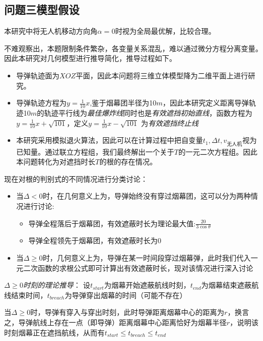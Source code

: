 \documentclass{article}
\begin{document}
\subsection{问题三模型假设}
本研究中将$无人机移动方向角\alpha = 0$时视为全局最优解，比较合理。

不难观察出，本题限制条件繁杂，各变量关系混乱，难以通过微分方程分离变量。因此本研究对几何模型进行推导简化，推导过程如下。

\begin{itemize}
    \item 导弹轨迹面为$XOZ$平面，因此本问题将三维立体模型降为二维平面上进行研究。
    \item 导弹轨迹方程为$y = \frac{1}{10}x$,鉴于烟幕团半径为10$m$，因此本研究定义距离导弹轨迹10$m$的轨迹平行线为\textit{最佳爆炸线}同时也是\textit{有效遮挡初始直线}，函数方程为$y = \frac{1}{10}x + \sqrt{101}$，定义$y = \frac{1}{10}x - \sqrt{101}$
    为\textit{有效遮挡终止线}
    \item 本研究采用模拟退火算法，因此可以在计算过程中把自变量$t_1 , \Delta t , v_\text{无人机}$视为已知量。通过联立方程组，我们最终解出一个关于$T$的一元二次方程组。因此本问题转化为对遮挡时长$T$的根的存在情况。
\end{itemize}

现在对根的判别式的不同情况进行分类讨论：
\begin{itemize}
    \item 当$\Delta < 0$时，在几何意义上为，导弹始终没有穿过烟幕团，这可以分为两种情况进行讨论:\begin{itemize}
        \item 导弹全程落后于烟幕团，有效遮蔽时长为理论最大值:$\frac{20}{3\cos \theta}$
        \item 导弹全程领先于烟幕团，有效遮蔽时长为0
    \end{itemize}
    \item 当$\Delta \ge 0$时，几何意义上为，导弹在某一时间段穿过烟幕弹，此时我们代入一元二次函数的求根公式即可计算出有效遮蔽时长，现对该情况进行深入讨论
\end{itemize}

\textit{$\Delta \ge 0$时刻的理论推导}：
设$t_{start}$为烟幕开始遮蔽航线时刻，$t_{end}$为烟幕结束遮蔽航线结束时间，$t_{breach}$为导弹穿出烟幕的时间（可能不存在）

当$\Delta \ge 0$时，导弹有穿入与穿出时刻，此时导弹距离烟幕中心的距离为$r$，换言之，导弹航线上存在一点（即导弹）距离烟幕中心距离恰好为烟幕半径$r$，说明该时刻烟幕正在遮挡航线，从而有$t_{start} \le t_{breach} \le t_{end}$
\end{document}
